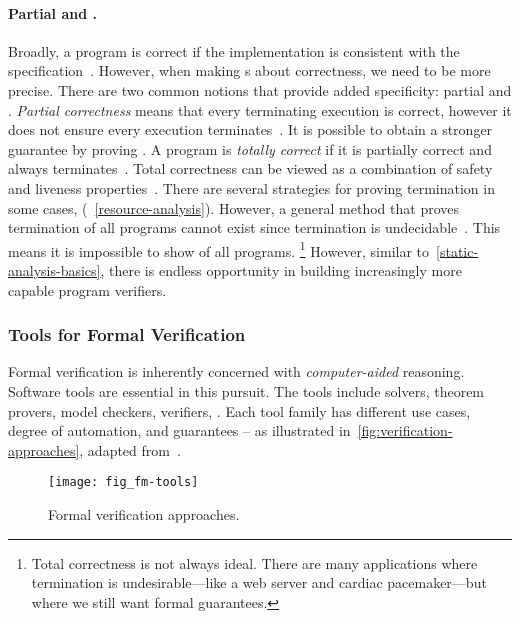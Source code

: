 \paragraph*{Partial and .}
Broadly, a program is correct if the implementation is consistent with the
specification~\cite{furia2014b}. However, when making
s about correctness, we need to be more precise. There are two common
notions that provide added specificity: partial and
. \emph{Partial correctness}
means that every terminating execution is correct, however it does not ensure
every execution terminates~\cite[p. 64]{leino2023}. It is possible to obtain a
stronger guarantee by proving . A program is
\emph{totally correct} if it is partially correct and always terminates~\cite[p.
64]{leino2023}. Total correctness can be viewed as a
combination of safety and liveness
properties~\cite{lamport1977}. There are several
strategies for proving termination in some cases,
(\cf~\autoref{resource-analysis}). However, a general method that proves
termination of all programs cannot exist since termination is
undecidable~\cite{turing1936}. This means it is impossible
to show  of all programs. \footnote{Total
correctness is not always ideal. There are many
applications where termination is undesirable---like a web server and cardiac
pacemaker---but where we still want formal guarantees.} However, similar
to~\autoref{static-analysis-basics}, there is endless opportunity in building
increasingly more capable program verifiers.

\subsubsection{Tools for Formal Verification}

Formal verification is inherently concerned with
\emph{computer-aided} reasoning. Software tools are essential in this pursuit.
The tools include solvers, theorem provers, model checkers, verifiers, \etc.
Each tool family has different use cases, degree of automation, and guarantees
-- as illustrated in~\autoref{fig:verification-approaches}, adapted
from~\textcite{leroy2018}.

\begin{figure}[ht]
\centering
\texttt{[image: fig\_fm-tools]}
\caption[Formal verification approaches]{
Formal verification approaches.}
\label{fig:verification-approaches}
\end{figure}

